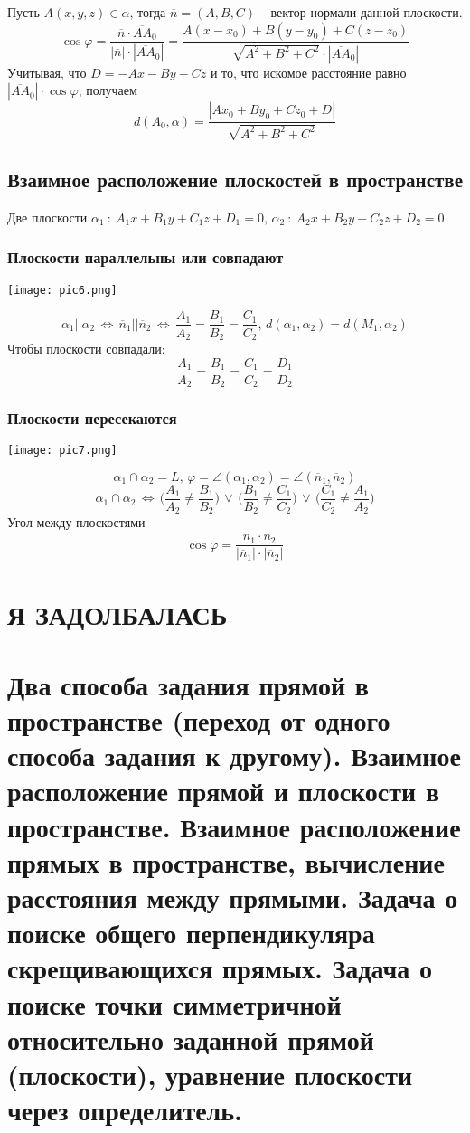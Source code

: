 \documentclass{article}
\begin{document}
Пусть $A(x,y,z)\in\alpha$, тогда $\overline{n}=(A,B,C)$ -- вектор нормали данной плоскости.
$$ \cos\varphi=\frac{\overline{n}\cdot\overline{AA}_0}{|\overline{n}|\cdot|\overline{AA}_0|}=\frac{A(x-x_0)+B(y-y_0)+C(z-z_0)}{\sqrt{A^2+B^2+C^2}\cdot|\overline{AA}_0|} $$
Учитывая, что $D=-Ax-By-Cz$ и то, что искомое расстояние равно $|\overline{AA}_0|\cdot\cos\varphi$, получаем
$$ d(A_0,\alpha)=\frac{|Ax_0+By_0+Cz_0+D|}{\sqrt{A^2+B^2+C^2}} $$
\subsection{Взаимное расположение плоскостей в пространстве}
Две плоскости $\alpha_1\::\:A_1x+B_1y+C_1z+D_1=0,\,\alpha_2\::\:A_2x+B_2y+C_2z+D_2=0$
\subsubsection{Плоскости параллельны или совпадают}
\begin{center}
    \texttt{[image: pic6.png]}
\end{center}
$$ \alpha_1||\alpha_2\,\Leftrightarrow\,\overline{n}_1||\overline{n}_2\,\Leftrightarrow\,\frac{A_1}{A_2}=\frac{B_1}{B_2}=\frac{C_1}{C_2},\,d(\alpha_1,\alpha_2)=d(M_1,\alpha_2) $$
Чтобы плоскости совпадали:
$$ \frac{A_1}{A_2}=\frac{B_1}{B_2}=\frac{C_1}{C_2}=\frac{D_1}{D_2} $$
\subsubsection{Плоскости пересекаются}
\begin{center}
    \texttt{[image: pic7.png]}
\end{center}
$$ \alpha_1\cap\alpha_2=L,\,\varphi=\angle(\alpha_1,\alpha_2)=\angle(\overline{n}_1,\overline{n}_2) $$
$$ \alpha_1\cap\alpha_2\,\Leftrightarrow\,\bigg(\frac{A_1}{A_2}\neq\frac{B_1}{B_2}\bigg)\,\lor\,\bigg(\frac{B_1}{B_2}\neq\frac{C_1}{C_2}\bigg)\,\lor\,\bigg(\frac{C_1}{C_2}\neq\frac{A_1}{A_2}\bigg) $$
Угол между плоскостями
$$ \cos\varphi=\frac{\overline{n}_1\cdot\overline{n}_2}{|\overline{n}_1|\cdot|\overline{n}_2|} $$
\newpage
\section{Я ЗАДОЛБАЛАСЬ}
\newpage
\section{Два способа задания прямой в пространстве (переход от одного способа задания к другому). Взаимное расположение прямой и плоскости в пространстве. Взаимное расположение прямых в пространстве, вычисление расстояния между прямыми. Задача о поиске общего перпендикуляра скрещивающихся прямых. Задача о поиске точки симметричной относительно заданной прямой (плоскости), уравнение плоскости через определитель.}
\end{document}
